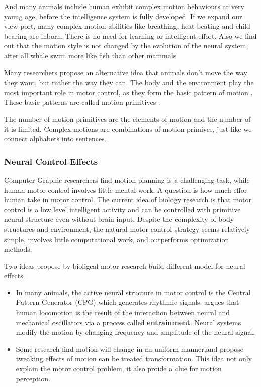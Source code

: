 And many animals include human exhibit complex motion behaviours at very young age, before the intelligence system is fully developed.
If we expand our view port, many complex motion abilities like breathing, heat beating and child bearing are inborn.
There is no need for learning or intelligent effort.
Also we find out that the motion style is not changed by the evolution of the neural system, after all whale swim more like fish than other mammals

Many researchers propose an alternative idea that animals don’t move the way they want, but rather the way they can. 
The body and the environment play the most important role in motor control, as they form the basic pattern of motion \citep{nishikawa2007neuromechanics}.
These basic patterns are called motion primitives \citep{Poggio2004}.

The number of motion primitives are the elements of motion and the number of it is limited.
Complex motions are combinations of motion primives, just like we connect alphabets into sentences.




\subsubsection*{Neural Control Effects}
Computer Graphic researchers find motion planning is a challenging task, while human motor control involves little mental work.
A question is how much effor human take in motor control.
The current idea of biology research is that motor control is a low level intelligent activity and can be controlled with primitive neural structure even without brain input. 
Despite the complexity of body structures and environment, the natural motor control strategy seems relatively simple, involves little computational work, and outperforms optimization methods. 

Two ideas propose by bioligcal motor research build different model for neural effects.
\begin{itemize}
\item
In many animals, the active neural structure in motor control is the Central Pattern Generator (CPG) which generates rhythmic signals.
\citet{Cohen1988a} argues that human locomotion is the result of the interaction between neural and mechanical oscillators via a process called \textbf{entrainment}.
Neural systems modify the motion by changing frequency and amplitude of the neural signal.

\item
Some research find motion will change in an uniform manner\citep{Viviani1992},and propose tweaking effects of motion can be treated  transformation\citep{flash2007affine}.
This idea not only explain the motor control problem, it also proide a clue for motion perception.

\end{itemize}





